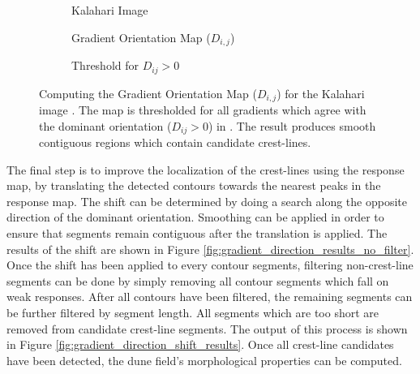 \begin{figure}
	\centering
	\begin{subfigure}{0.48\textwidth}
		\centering
		\caption{Kalahari Image}
		\label{fig:gradient_orientation_kalahari_input}
	\end{subfigure}
	\begin{subfigure}{0.48\textwidth}
		\centering
		\caption{ Gradient Orientation Map ($D_{i,j}$) }
		\label{fig:gradient_orientation_map_kalahari}
	\end{subfigure}
	\begin{subfigure}{0.8\textwidth}
		\centering
		\caption{ Threshold for $D_{ij} > 0$ }
		\label{fig:threshold_gradient_orientation_map_kalahari}
	\end{subfigure}
	\caption{ Computing the Gradient Orientation Map  ($D_{i,j}$) for the Kalahari image . The map is thresholded for all gradients which agree with the dominant orientation ($D_{ij} > 0$) in . The result produces smooth contiguous regions which contain candidate crest-lines. }
	\label{fig:gradient_orientation_map}
\end{figure}

The final step is to improve the localization of the crest-lines using the response map, by translating the detected contours towards the nearest peaks in the response map. The shift can be determined by doing a search along the opposite direction of the dominant orientation. Smoothing can be applied in order to ensure that segments remain contiguous after the translation is applied. The results of the shift are shown in Figure \ref{fig:gradient_direction_results_no_filter}. Once the shift has been applied to every contour segments, filtering non-crest-line segments can be done by simply removing all contour segments which fall on weak responses. After all contours have been filtered, the remaining segments can be further filtered by segment length. All segments which are too short are removed from candidate crest-line segments. The output of this process is shown in Figure \ref{fig:gradient_direction_shift_results}. Once all crest-line candidates have been detected, the dune field's morphological properties can be computed.

